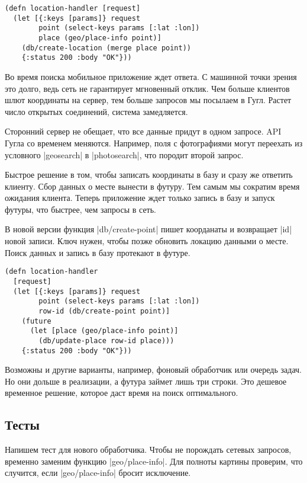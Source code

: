 \begin{verbatim}
(defn location-handler [request]
  (let [{:keys [params]} request
        point (select-keys params [:lat :lon])
        place (geo/place-info point)]
    (db/create-location (merge place point))
    {:status 200 :body "OK"}))
\end{verbatim}

Во время поиска мобильное приложение ждет ответа. С машинной точки зрения это
долго, ведь сеть не гарантирует мгновенный отклик. Чем больше клиентов шлют
координаты на сервер, тем больше запросов мы посылаем в Гугл. Растет число
открытых соединений, система замедляется.

Сторонний сервер не обещает, что все данные придут в одном запросе. API Гугла со
временем меняются. Например, поля с фотографиями могут переехать из условного
\spverb|geosearch| в \spverb|photosearch|, что породит второй запрос.

Быстрое решение в том, чтобы записать координаты в базу и сразу же ответить
клиенту. Сбор данных о месте вынести в футуру. Тем самым мы сократим время
ожидания клиента. Теперь приложение ждет только запись в базу и запуск футуры,
что быстрее, чем запросы в сеть.

В новой версии функция \spverb|db/create-point| пишет коорданаты и возвращает
\spverb|id| новой записи. Ключ нужен, чтобы позже обновить локацию данными о
месте. Поиск данных и запись в базу протекают в футуре.

\begin{verbatim}
(defn location-handler
  [request]
  (let [{:keys [params]} request
        point (select-keys params [:lat :lon])
        row-id (db/create-point point)]
    (future
      (let [place (geo/place-info point)]
        (db/update-place row-id place)))
    {:status 200 :body "OK"}))
\end{verbatim}

Возможны и другие варианты, например, фоновый обработчик или очередь задач. Но
они дольше в реализации, а футура займет лишь три строки. Это дешевое временное
решение, которое даст время на поиск оптимального.

\subsection{Тесты}

Напишем тест для нового обработчика. Чтобы не порождать сетевых запросов,
временно заменим функцию \spverb|geo/place-info|. Для полноты картины проверим,
что случится, если \spverb|geo/place-info| бросит исключение.

